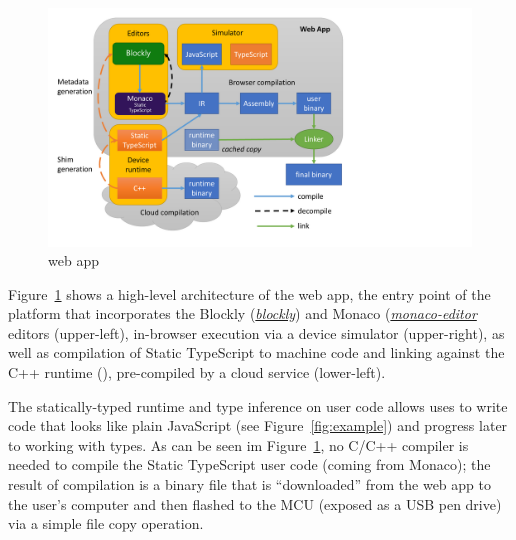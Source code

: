 \begin{figure}[t]
    \includegraphics[width=4.8in]{makecodeFig.pdf}
\caption{\label{fig:makecode}\MC web app}
\end{figure}

Figure~\ref{fig:makecode} shows a high-level architecture of
the \MC web app, the entry point of the platform that
incorporates the Blockly
(\emph{\href{https://github.com/google/blockly}{blockly}}) and Monaco
(\emph{\href{https://github.com/Microsoft/monaco-editor}{monaco-editor}}
editors (upper-left), in-browser execution via a device simulator (upper-right),
as well as compilation of Static TypeScript to machine code and linking against 
the C++ runtime (\emph{\CON}), pre-compiled by a cloud service (lower-left).

The statically-typed runtime and type inference on user code allows uses to write code
that looks like plain JavaScript (see Figure~\ref{fig:example}) and progress later to working
with types. As can be seen im Figure~\ref{fig:makecode}, 
no C/C++ compiler is needed to compile the Static TypeScript user code (coming from Monaco);
the result of compilation is a binary file that is ``downloaded'' from the web app to the user's
computer and then flashed to the MCU (exposed as a USB pen drive)
via a simple file copy operation.

